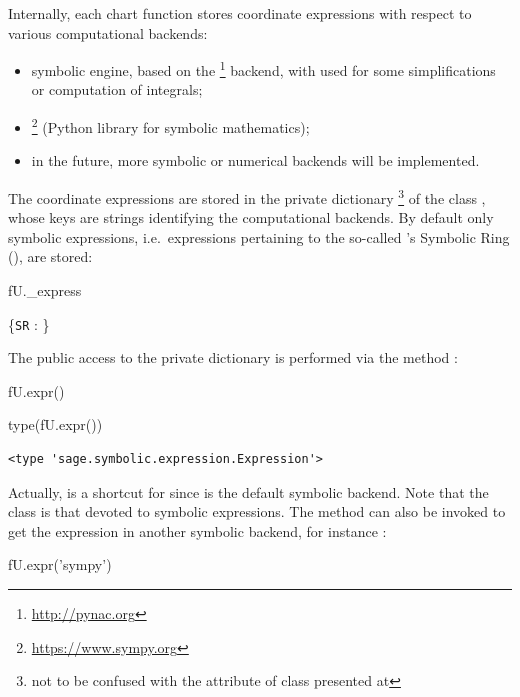 Internally, each chart function stores coordinate expressions with respect
to various computational backends:
\begin{itemize}
\item \Sage{} symbolic engine, based on the \footnote{\url{http://pynac.org}} backend, with  used for some simplifications
or computation of integrals;
\item {}\footnote{\url{https://www.sympy.org}} (Python library for symbolic mathematics);
\item in the future, more symbolic or numerical backends will be implemented.
\end{itemize}
The coordinate expressions are stored in the private dictionary \footnote{not to be confused with
the attribute  of class  presented
at }
of the class ,
whose keys are strings identifying the computational backends. By default
only \Sage{} symbolic expressions, i.e.\ expressions pertaining
to the so-called \Sage{}'s Symbolic Ring (),
are stored:
\begin{NBin}
fU._express
\end{NBin}
\begin{NBoutM}
\left\{\verb|SR| : \right\}
\end{NBoutM}
The public access to the private dictionary  is performed via the
method :
\begin{NBin}
fU.expr()
\end{NBin}
\begin{NBoutM}
\end{NBoutM}
\begin{NBin}
type(fU.expr())
\end{NBin}
\begin{NBout}
\begin{verbatim}
<type 'sage.symbolic.expression.Expression'>
\end{verbatim}
\end{NBout}
Actually,  is a shortcut for  since
 is the default symbolic backend. Note that the class
 is that devoted to \Sage{} symbolic expressions.
The method  can also be invoked to get the expression in
another symbolic backend, for instance :
\begin{NBin}
fU.expr('sympy')
\end{NBin}
